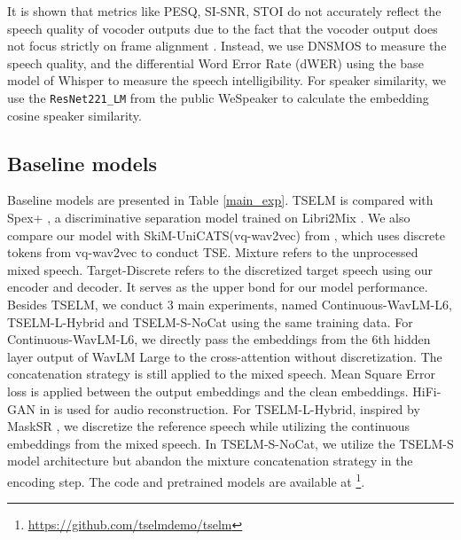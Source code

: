 \documentclass[conference]{IEEEtran}
\begin{document}
It is shown that metrics like PESQ, SI-SNR, STOI do not accurately reflect the speech quality of 
vocoder outputs due to the fact that the vocoder output does not focus strictly on frame alignment
\cite{tokensplit,selm}. Instead, we use DNSMOS \cite{dnsmos} to measure the speech quality, and the differential 
Word Error 
Rate (dWER) \cite{dwer} using the base model of Whisper \cite{whisper} to measure the speech intelligibility. For speaker similarity, we use the \texttt{ResNet221\_LM}
from the public WeSpeaker \cite{wespeaker} to calculate the embedding cosine speaker similarity.


\subsection{Baseline models}
Baseline models are presented in Table \ref{main_exp}. 
TSELM is compared with Spex+ \cite{spex_plus}, a discriminative separation model trained on Libri2Mix \cite{librimix}. 
We also compare our model with SkiM-UniCATS(vq-wav2vec) from \cite{gen_tse}, which uses discrete tokens from vq-wav2vec to conduct TSE. 
Mixture refers to the unprocessed mixed speech. 
Target-Discrete refers to the discretized target speech using our encoder and decoder. 
It serves as the upper bond for our model performance.  Besides TSELM, we conduct 3 main experiments, named
 Continuous-WavLM-L6, TSELM-L-Hybrid and TSELM-S-NoCat using the same training data. 
For Continuous-WavLM-L6, we directly
pass the embeddings from the 6th hidden layer output of WavLM Large to the cross-attention without discretization. 
The concatenation strategy is still applied to the mixed speech. Mean Square Error loss is applied between the output embeddings and the clean 
embeddings. HiFi-GAN in \cite{knn_vc} is used for audio reconstruction. For 
TSELM-L-Hybrid, inspired by MaskSR \cite{mask_sr}, we discretize the reference 
speech while utilizing the continuous embeddings from the mixed speech. In TSELM-S-NoCat, we utilize the TSELM-S model architecture but abandon the mixture concatenation strategy in the encoding step. The code and pretrained models are available at \footnote{\href{https://github.com/tselmdemo/tselm}{https://github.com/tselmdemo/tselm}}.
\end{document}
